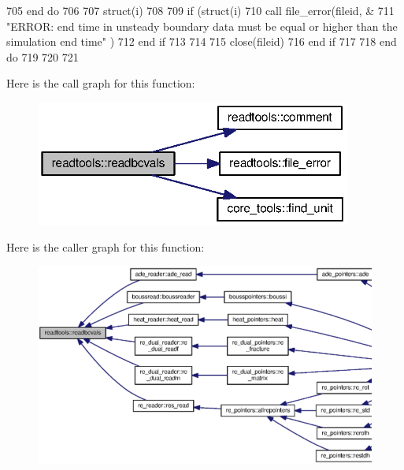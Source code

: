 \begin{DoxyCode}
705 \textcolor{comment}{}\textcolor{keywordflow}{          end do}
706 
707           struct(i)%
708        
709           \textcolor{keywordflow}{if} (struct(i)%
710             \textcolor{keyword}{call }file_error(fileid, &
711             \textcolor{stringliteral}{"ERROR: end time in unsteady boundary data must be equal or higher than the simulation end
       time"}\textcolor{comment}{ )}
712 \textcolor{comment}{}\textcolor{keywordflow}{          end if}
713 
714 
715           \textcolor{keyword}{close}(fileid)
716 \textcolor{keywordflow}{        end if}
717 
718 \textcolor{keywordflow}{      end do}
719 
720       
721 
\end{DoxyCode}


Here is the call graph for this function\+:\nopagebreak
\begin{figure}[H]
\begin{center}
\leavevmode
\includegraphics[width=294pt]{namespacereadtools_a35dde6b411a1476727771fcb8f5d1bc9_cgraph}
\end{center}
\end{figure}




Here is the caller graph for this function\+:\nopagebreak
\begin{figure}[H]
\begin{center}
\leavevmode
\includegraphics[width=350pt]{namespacereadtools_a35dde6b411a1476727771fcb8f5d1bc9_icgraph}
\end{center}
\end{figure}


